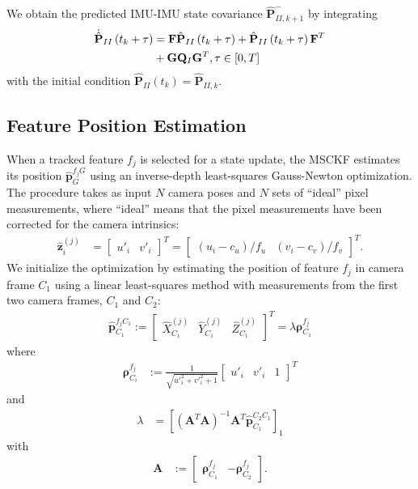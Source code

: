 \documentclass[letterpaper, 10 pt, conference]{ieeeconf}  %
\def\Vec#1{\mathbf{#1}}
\newcommand{\bbm}{\begin{bmatrix}}
\newcommand{\ebm}{\end{bmatrix}}
\begin{document}
We obtain the predicted IMU-IMU state covariance $\hat{\Vec{P}}^-_{II,k+1}$ by integrating
\begin{align} \label{eq:imucovar}
    \dot{\hat{\Vec{P}}}_{II}\left(t_k  + \tau \right) &= \Vec{F} \hat{\Vec{P}}_{II}\left(t_k  + \tau \right) 
                 + \hat{\Vec{P}}_{II}\left(t_k  + \tau \right) \Vec{F}^T \notag \\ 
                & + \Vec{G} \Vec{Q}_I \Vec{G}^T, \tau\in\left[0,T\right]
\end{align}
with the initial condition $\hat{\Vec{P}}_{II}\left(t_k\right) = \hat{\Vec{P}}_{II,k}$. 

\subsection{Feature Position Estimation}
When a tracked feature $f_j$ is selected for a state update, the MSCKF estimates its position $\hat{\Vec{p}}_G^{f_j G}$ using an inverse-depth least-squares Gauss-Newton optimization. 
The procedure takes as input $N$ camera poses and $N$ sets of ``ideal'' pixel measurements, where ``ideal'' means that the pixel measurements have been corrected for the camera intrinsics:
\begin{align}
\hat{\Vec{z}}_i^{(j)} &= \bbm u'_i & v'_i \ebm ^T = \bbm (u_i - c_u)/f_u & (v_i - c_v)/f_v \ebm ^T.
\end{align}
We initialize the optimization by estimating the position of feature $f_j$ in camera frame $C_1$ using a linear least-squares method with measurements from the first two camera frames, $C_1$ and $C_2$:
\begin{align}
\hat{\Vec{p}}_{C_1}^{f_j C_1} := \bbm \hat{X}^{(j)}_{C_1} & \hat{Y}^{(j)}_{C_1} & \hat{Z}^{(j)}_{C_1} \ebm ^T = \lambda \boldsymbol{\rho}_{C_1}^{f_j}
\end{align}
where
\begin{align}
\boldsymbol{\rho}_{C_i}^{f_j} &:= \frac{1}{\sqrt{u'^2_i + v'^2_i + 1}}\bbm u'_i & v'_i & 1\ebm^T
\end{align}
and
\begin{align}
\lambda &= \left[(\Vec A^T \Vec A)^{-1} \Vec A^T \hat{\Vec{p}}_{C_1}^{C_2 C_1} \right]_1
\end{align}
with
\begin{align}
\Vec A &:= \bbm \boldsymbol{\rho}_{C_1}^{f_j} & -\boldsymbol{\rho}_{C_2}^{f_j} \ebm.
\end{align}
\end{document}
